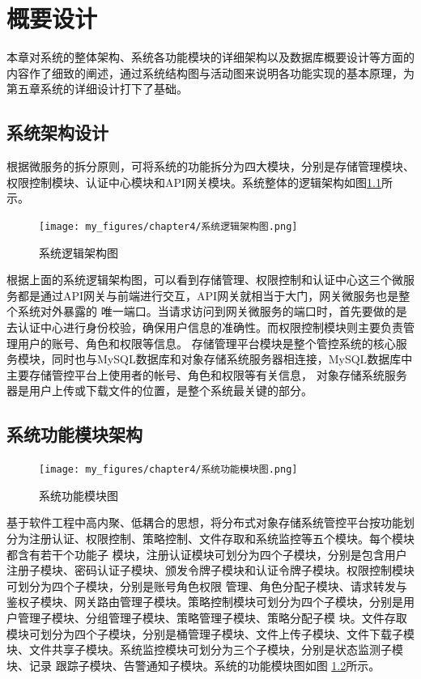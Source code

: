 \chapter{概要设计}


本章对系统的整体架构、系统各功能模块的详细架构以及数据库概要设计等方面的内容作了细致的阐述，通过系统结构图与活动图来说明各功能实现的基本原理，为第五章系统的详细设计打下了基础。


\section{系统架构设计}

根据微服务的拆分原则，可将系统的功能拆分为四大模块，分别是存储管理模块、权限控制模块、认证中心模块和API网关模块。系统整体的逻辑架构如图\ref{fig:系统逻辑架构图}所示。
\begin{figure}[h]
    \centering
    \texttt{[image: my\_figures/chapter4/系统逻辑架构图.png]}
    \caption{系统逻辑架构图}
    \label{fig:系统逻辑架构图}
\end{figure}

根据上面的系统逻辑架构图，可以看到存储管理、权限控制和认证中心这三个微服务都是通过API网关与前端进行交互，API网关就相当于大门，网关微服务也是整个系统对外暴露的
唯一端口。当请求访问到网关微服务的端口时，首先要做的是去认证中心进行身份校验，确保用户信息的准确性。而权限控制模块则主要负责管理用户的账号、角色和权限等信息。
存储管理平台模块是整个管控系统的核心服务模块，同时也与MySQL数据库和对象存储系统服务器相连接，MySQL数据库中主要存储管控平台上使用者的帐号、角色和权限等有关信息，
对象存储系统服务器是用户上传或下载文件的位置，是整个系统最关键的部分。

\section{系统功能模块架构}

\begin{figure}[h]
    \centering
    \texttt{[image: my\_figures/chapter4/系统功能模块图.png]}
    \caption{系统功能模块图}
    \label{fig:系统功能模块图}
\end{figure}

基于软件工程中高内聚、低耦合的思想，将分布式对象存储系统管控平台按功能划分为注册认证、权限控制、策略控制、文件存取和系统监控等五个模块。每个模块都含有若干个功能子
模块，注册认证模块可划分为四个子模块，分别是包含用户注册子模块、密码认证子模块、颁发令牌子模块和认证令牌子模块。权限控制模块可划分为四个子模块，分别是账号角色权限
管理、角色分配子模块、请求转发与鉴权子模块、网关路由管理子模块。策略控制模块可划分为四个子模块，分别是用户管理子模块、分组管理子模块、策略管理子模块、策略分配子模
块。文件存取模块可划分为四个子模块，分别是桶管理子模块、文件上传子模块、文件下载子模块、文件共享子模块。系统监控模块可划分为三个子模块，分别是状态监测子模块、记录
跟踪子模块、告警通知子模块。系统的功能模块图如图 \ref{fig:系统功能模块图}所示。

